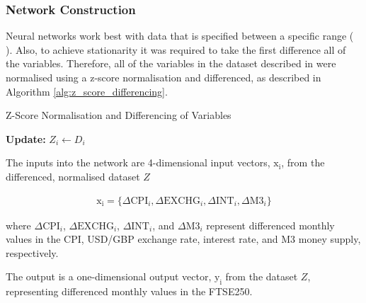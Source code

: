 \documentclass[11pt,a4paper]{article}
\newcommand{\citeboth}[1]{\citeauthor{#1} \citep{#1}}
\begin{document}
\subsubsection{Network Construction}

Neural networks work best with data that is specified between a specific 
range (\citeboth{mendelsohn1993}). Also, to achieve stationarity
it was required to take the first difference all of the variables. Therefore, all of the 
variables in the dataset described in were normalised using a z-score normalisation
and differenced, as described in Algorithm \ref{alg:z_score_differencing}. 

\begin{algorithm}[H]
    \caption{Z-Score Normalisation and Differencing of Variables}
    \label{alg:z_score_differencing}
    
    \textbf{Update:} $Z_i \leftarrow D_i$ \;
\end{algorithm}

The inputs into the network are 4-dimensional input vectors, \(\boldsymbol{\mathrm{x_i}}\), from the differenced, normalised dataset $Z$

\begin{align}
    \boldsymbol{\mathrm{x_i}} = \{\Delta \text{CPI}_i, \Delta \text{EXCHG}_i, \Delta \text{INT}_i, \Delta \text{M3}_i\}
\end{align}

where \(\Delta \text{CPI}_i\), \(\Delta \text{EXCHG}_i\), \(\Delta \text{INT}_i\), and \(\Delta \text{M3}_i\) 
represent differenced monthly values in the CPI, USD/GBP exchange rate, interest rate, and M3 money supply, respectively. 

The output is a one-dimensional output vector, \(\boldsymbol{\mathrm{y_i}}\) from the dataset $Z$, representing differenced monthly values in the FTSE250.
\end{document}
